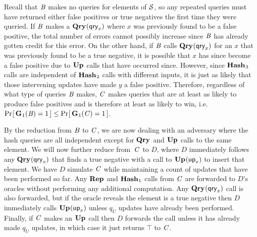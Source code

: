 Recall that $\mathit{B}$ makes no queries for elements of $\mathcal{S}$, so any repeated
queries must have returned either false positives or true negatives the first
time they were queried. If $\mathit{B}$ makes a $\textup{\textbf{Qry}}\hspace{0.5pt}(\mathsf{qry}_x)$ where $x$ was
previously found to be a false positive, the total number of errors cannot
possibly increase since $\mathit{B}$ has already gotten credit for this error. On the
other hand, if $\mathit{B}$ calls $\textup{\textbf{Qry}}\hspace{0.5pt}(\mathsf{qry}_x)$ for an $x$ that was previously
found to be a true negative, it is possible that $x$ has since become a false
positive due to $\textup{\textbf{Up}}\hspace{0.5pt}$ calls that have occurred since. However, since $\textup{\textbf{Hash}}\hspace{0.5pt}_3$
calls are independent of $\textup{\textbf{Hash}}\hspace{0.5pt}_2$ calls with different inputs, it is just as
likely that those intervening updates have made $y$ a false positive. Therefore,
regardless of what type of queries $\mathit{B}$ makes, $\mathit{C}$ makes queries that are
at least as likely to produce false positives and is therefore at least as
likely to win, i.e. $\Pr\hspace{-1pt}\left[\,\textup{\textbf{G}}\hspace{0.5pt}_1(\mathit{B}) = 1\,\right] \le \Pr\hspace{-1pt}\left[\,\textup{\textbf{G}}\hspace{0.5pt}_1(\mathit{C}) = 1\,\right]$.

By the reduction from $\mathit{B}$ to $\mathit{C}$, we are now dealing with an adversary
where the hash queries are all independent except for $\textup{\textbf{Qry}}\hspace{0.5pt}$ and $\textup{\textbf{Up}}\hspace{0.5pt}$ calls
to the same element. We will now further reduce from~$\mathit{C}$ to $D$, where $D$
immediately follows any $\textup{\textbf{Qry}}\hspace{0.5pt}(\mathsf{qry}_x)$ that finds a true negative with a
call to $\textup{\textbf{Up}}\hspace{0.5pt}(\mathsf{up}_x)$ to insert that element. We have $D$ simulate $\mathit{C}$ while
maintaining a count of updates that have been performed so far. Any $\textup{\textbf{Rep}}\hspace{0.5pt}$ and
$\textup{\textbf{Hash}}\hspace{0.5pt}_1$ calls from $\mathit{C}$ are forwarded to $D$'s oracles without
performing any additional computation. Any $\textup{\textbf{Qry}}\hspace{0.5pt}(\mathsf{qry}_x)$ call is also
forwarded, but if the oracle reveals the element is a true negative then $D$
immediately calls $\textup{\textbf{Up}}\hspace{0.5pt}(\mathsf{up}_x)$ unless $q_U$ updates have already been
performed. Finally, if $\mathit{C}$ makes an $\textup{\textbf{Up}}\hspace{0.5pt}$ call then $D$ forwards the call
unless it has already made $q_U$ updates, in which case it just returns $\top$
to $\mathit{C}$.

